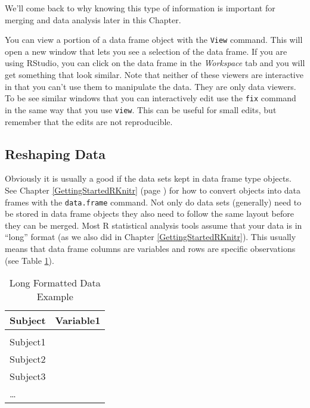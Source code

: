 \noindent We'll come back to why knowing this type of information is important for merging and data analysis later in this Chapter.

You can view a portion of a data frame object with the \texttt{View} command. This will open a new window that lets you see a selection of the data frame. If you are using RStudio, you can click on the data frame in the \emph{Workspace} tab and you will get something that look similar. Note that neither of these viewers are interactive in that you can't use them to manipulate the data. They are only data viewers. To be see similar windows that you can interactively edit use the \texttt{fix} command in the same way that you use \texttt{view}. This can be useful for small edits, but remember that the edits are not reproducible.

\subsection{Reshaping Data}

Obviously it is usually a good if the data sets kept in data frame type objects. See Chapter \ref{GettingStartedRKnitr} (page \pageref{data.frame}) for how to convert objects into data frames with the \texttt{data.frame} command. Not only do data sets (generally) need to be stored in data frame objects they also need to follow the same layout before they can be merged. Most R statistical analysis tools assume that your data is in ``long'' format (as we also did in Chapter \ref{GettingStartedRKnitr}). This usually means that data frame columns are variables and rows are specific observations (see Table \ref{ExampleLong}).

\begin{table}[h!]
    \caption{Long Formatted Data Example}
    \label{ExampleLong}
    \begin{tabular}{l c}
        \\[0.15cm]
        \hline
        Subject & Variable1 \\
        \hline \\[0.1cm]
        Subject1 & \\[0.25cm]
        Subject2 & \\[0.25cm]
        Subject3 & \\[0.25cm]
        \ldots & \\[0.25cm]
        \hline
    \end{tabular}
\end{table}

